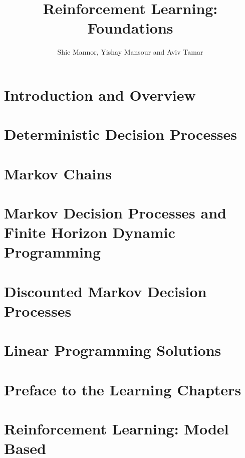 \documentclass[12pt]{book}
\title{Reinforcement Learning: Foundations}
\date{October 2023
\\
  \textcolor{red}{This book is still work in progress. In particular, references to literature are not complete. We would be grateful for comments, suggestions, omissions, and errors of any kind, at \url{rlfoundationsbook@gmail.com}. }

\flushleft{Please cite as\\
\textcolor{blue}{
@book$\{$MannorMT-RLbook,\\
  url = $\{$https://sites.google.com/view/rlfoundations/home$\}$,\\
  author = $\{$Mannor, Shie and Mansour, Yishay and Tamar, Aviv$\}$,\\
  title = $\{$Reinforcement Learning:  Foundations$\}$,\\
  year = $\{$2023$\}$,\\
  publisher = $\{$-$\}$\\
$\}$\\
}
}

}
\author{Shie Mannor, Yishay Mansour and Aviv Tamar}
\begin{document}
\maketitle

\tableofcontents



\chapter{Introduction and Overview}
\label{chapter:intro}


\chapter{Deterministic Decision Processes}
\label{chapter:DDP}


\chapter{Markov Chains}
\label{chapter:MC}


\chapter{Markov Decision Processes and Finite Horizon Dynamic Programming}
\label{chapter:MDP-FH}


\chapter{Discounted Markov Decision Processes}
\label{chapter:disc}


\chapter{Linear Programming Solutions}\label{chapter-LP}


\chapter{Preface to the Learning Chapters}\label{chapter-learning-preface}


\chapter{Reinforcement Learning: Model Based}\label{chapter-model-based}

\end{document}
